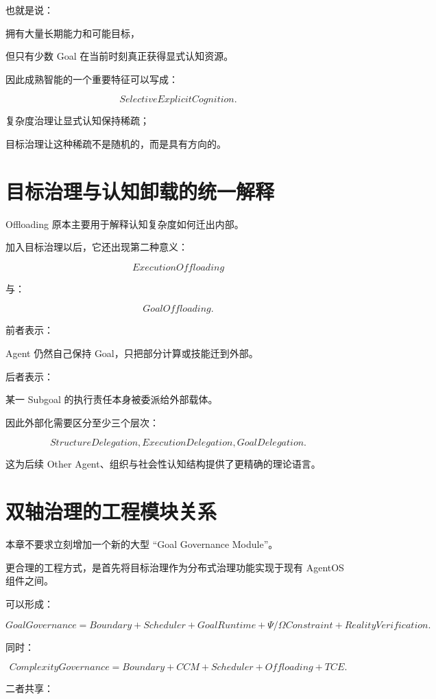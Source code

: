 也就是说：

拥有大量长期能力和可能目标，

但只有少数 Goal 在当前时刻真正获得显式认知资源。

因此成熟智能的一个重要特征可以写成：

\[
\boxed{
SelectiveExplicitCognition.
}
\]

复杂度治理让显式认知保持稀疏；

目标治理让这种稀疏不是随机的，而是具有方向的。


\section{目标治理与认知卸载的统一解释}

Offloading 原本主要用于解释认知复杂度如何迁出内部。

加入目标治理以后，它还出现第二种意义：

\[
\boxed{
ExecutionOffloading
}
\]

与：

\[
\boxed{
GoalOffloading.
}
\]

前者表示：

Agent 仍然自己保持 Goal，只把部分计算或技能迁到外部。

后者表示：

某一 Subgoal 的执行责任本身被委派给外部载体。

因此外部化需要区分至少三个层次：

\[
\boxed{
StructureDelegation,
ExecutionDelegation,
GoalDelegation.
}
\]

这为后续 Other Agent、组织与社会性认知结构提供了更精确的理论语言。


\section{双轴治理的工程模块关系}

本章不要求立刻增加一个新的大型 ``Goal Governance Module''。

更合理的工程方式，是首先将目标治理作为分布式治理功能实现于现有 AgentOS 组件之间。

可以形成：

\[
\boxed{
GoalGovernance
=
Boundary
+
Scheduler
+
GoalRuntime
+
\Psi/\Omega Constraint
+
RealityVerification.
}
\]

同时：

\[
\boxed{
ComplexityGovernance
=
Boundary
+
CCM
+
Scheduler
+
Offloading
+
TCE.
}
\]

二者共享：

